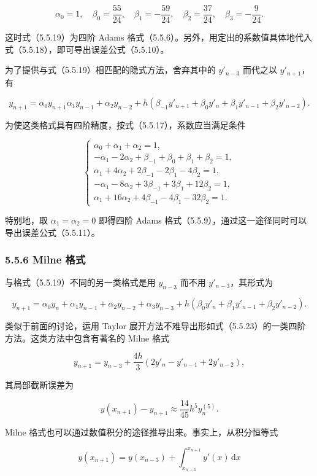 \[
\alpha_0=1,\quad\beta_0=\frac{55}{24},\quad\beta_1=-\frac{59}{24},\quad\beta_2=\frac{37}{24},\quad\beta_3=-\frac9{24}.
\]

这时式（5.5.19）为四阶 Adams 格式（5.5.6）。另外，用定出的系数值具体地代入式（5.5.18），即可导出误差公式（5.5.10）。

为了提供与式（5.5.19）相匹配的隐式方法，舍弃其中的 \(y'_{n-3}\) 而代之以 \(y'_{n+1}\)，有

\[
y_{n+1}=\alpha_0y_{n+1}\alpha_1y_{n-1}+\alpha_2y_{n-2}+h(\beta_{-1}y'_{n+1}+\beta_0y'_n+\beta_1y'_{n-1}+\beta_2y'_{n-2}).
\tag{5.5.21}
\]

为使这类格式具有四阶精度，按式（5.5.17），系数应当满足条件

\[
\begin{cases}
\alpha_0+\alpha_1+\alpha_2=1,\\
-\alpha_1-2\alpha_2+\beta_{-1}+\beta_0+\beta_1+\beta_2=1,\\
\alpha_1+4\alpha_2+2\beta_{-1}-2\beta_1-4\beta_2=1,\\
-\alpha_1-8\alpha_2+3\beta_{-1}+3\beta_1+12\beta_2=1,\\
\alpha_1+16\alpha_2+4\beta_{-1}-4\beta_1-32\beta_2=1.
\end{cases}
\tag{5.5.22}
\]

特别地，取 \(\alpha_1=\alpha_2=0\) 即得四阶 Adams 格式（5.5.9），通过这一途径同时可以导出误差公式（5.5.11）。

\subsubsection{5.5.6 Milne 格式}\label{ch05b-milne-ux683cux5f0f}

与格式（5.5.19）不同的另一类格式是用 \(y_{n-3}\) 而不用 \(y'_{n-3}\)，其形式为

\[
y_{n+1}=\alpha_0y_n+\alpha_1y_{n-1}+\alpha_2y_{n-2}+\alpha_3y_{n-3}+h(\beta_0y'_n+\beta_1y'_{n-1}+\beta_2y'_{n-2}).
\tag{5.5.23}
\]

类似于前面的讨论，运用 Taylor 展开方法不难导出形如式（5.5.23）的一类四阶方法。这类方法中包含有著名的 Milne 格式

\[
y_{n+1}=y_{n-3}+\frac{4h}{3}(2y'_n-y'_{n-1}+2y'_{n-2}),
\tag{5.5.24}
\]

其局部截断误差为

\[
y(x_{n+1})-y_{n+1}\approx\frac{14}{45}h^5y_n^{(5)}.
\tag{5.5.25}
\]

Milne 格式也可以通过数值积分的途径推导出来。事实上，从积分恒等式

\[
y(x_{n+1})=y(x_{n-3})+\int_{x_{n-3}}^{x_{n+1}}y'(x)\,\mathrm dx
\tag{5.5.26}
\]

